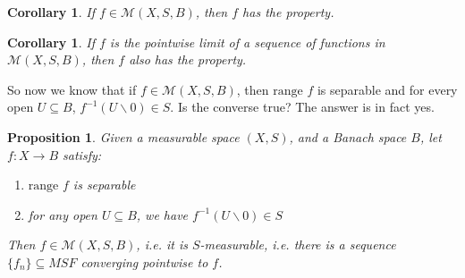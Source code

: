 \documentclass[a4paper,12pt]{report}
\newcommand{\ms}[1]{\mathscr{#1}}
\newcommand{\range}{ \text{range } }
\newcommand{\inv}[1] { #1^{-1} }
\newcommand{\sse} {\subseteq}
\newtheorem{corollary}[theorem]{Corollary}
\newtheorem{prop}[theorem]{Proposition}
\begin{document}
	\begin{corollary}
	If $f \in \ms{M}(X, S, B)$, then $f$ has the property. 
	\end{corollary}
	
	\begin{corollary}
	If $f$ is the pointwise limit of a sequence of functions in $\ms{M}(X, S, B)$, then $f$ also has the property. 
	\end{corollary}
	
	\noindent So now we know that if $f \in \ms{M}(X, S, B)$, then $\range f$ is separable and for every open $U \sse B$, $\inv{f}(U \backslash 0) \in S$. Is the converse true? The answer is in fact yes. 
	
	\begin{prop}
	Given a measurable space $(X, S)$, and a Banach space $B$, let $f: X \rightarrow B$ satisfy:
	\begin{enumerate}[label=(\alph*)]
		\item $\range f$ is separable
		\item for any open $U \sse B$, we have $\inv{f}(U \backslash 0) \in S$
	\end{enumerate}
	Then $f \in \ms{M}(X, S, B)$, i.e. it is $S$-measurable, i.e. there is a sequence $\{f_n\} \sse MSF$ converging pointwise to $f$. 
	\end{prop}
\end{document}
